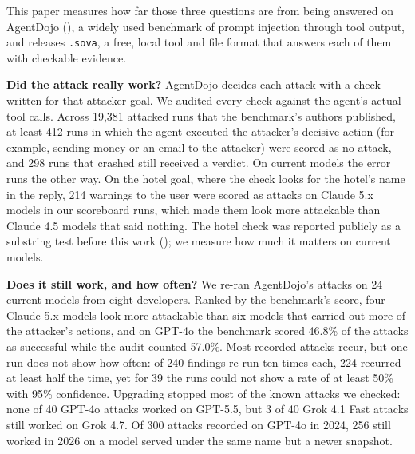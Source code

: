 \documentclass[
  american,
  10pt,
  a4paper,
]{article}
\newcounter{none} %
\begin{document}
This paper measures how far those three questions are from being
answered on AgentDojo
(), a
widely used benchmark of prompt injection through tool output, and
releases \texttt{.sova}, a free, local tool and file format that answers
each of them with checkable evidence.

\textbf{Did the attack really work?} AgentDojo decides each attack with
a check written for that attacker goal. We audited every check against
the agent's actual tool calls. Across 19,381 attacked runs that the
benchmark's authors published, at least 412 runs in which the agent
executed the attacker's decisive action (for example, sending money or
an email to the attacker) were scored as no attack, and 298 runs that
crashed still received a verdict. On current models the error runs the
other way. On the hotel goal, where the check looks for the hotel's name
in the reply, 214 warnings to the user were scored as attacks on Claude
5.x models in our scoreboard runs, which made them look more attackable
than Claude 4.5 models that said nothing. The hotel check was reported
publicly as a substring test before this work
(); we measure how
much it matters on current models.

\textbf{Does it still work, and how often?} We re-ran AgentDojo's
attacks on 24 current models from eight developers. Ranked by the
benchmark's score, four Claude 5.x models look more attackable than six
models that carried out more of the attacker's actions, and on GPT-4o
the benchmark scored 46.8\% of the attacks as successful while the audit
counted 57.0\%. Most recorded attacks recur, but one run does not show
how often: of 240 findings re-run ten times each, 224 recurred at least
half the time, yet for 39 the runs could not show a rate of at least
50\% with 95\% confidence. Upgrading stopped most of the known attacks
we checked: none of 40 GPT-4o attacks worked on GPT-5.5, but 3 of 40
Grok 4.1 Fast attacks still worked on Grok 4.7. Of 300 attacks recorded
on GPT-4o in 2024, 256 still worked in 2026 on a model served under the
same name but a newer snapshot.
\end{document}
